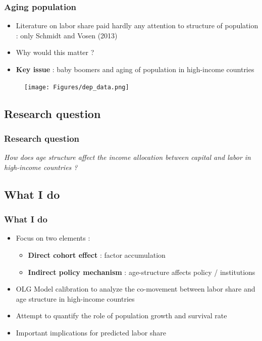\documentclass{beamer}
\begin{document}
			\begin{frame}\frametitle{Aging population}
				\begin{minipage}[h]{.49\textwidth}
					\begin{adjustwidth}{-2em}{0em}
						\begin{itemize}
							\item Literature on labor share paid hardly any attention to structure of population : only Schmidt and Vosen (2013)
							\vspace{1em}
							\item Why would this matter ?
							\vspace{1em}
							\item \textbf{Key issue} : baby boomers and aging of population in high-income countries
						\end{itemize}
					\end{adjustwidth}
				\end{minipage}
				\begin{minipage}[h]{.49\textwidth}
					\begin{figure}[h]
						\texttt{[image: Figures/dep\_data.png]}
					\end{figure}
				\end{minipage}
			\end{frame}
		
		\subsection{Research question}
		\begin{frame}\frametitle{Research question}
			\Large\textit{How does age structure affect the income allocation between capital and labor in high-income countries ?}
		\end{frame}
		
		\subsection{What I do}
		\begin{frame}\frametitle{What I do}
				\begin{itemize}
					\item Focus on two elements :
					\begin{itemize}
						\item \textbf{Direct cohort effect} : factor accumulation
						\item \textbf{Indirect policy mechanism} : age-structure affects policy / institutions
					\end{itemize}
					\vspace{1em}
					\item OLG Model calibration to analyze the co-movement between labor share and age structure in high-income countries
					\vspace{1em}
					\item Attempt to quantify the role of population growth and survival rate
					\item Important implications for predicted labor share
				\end{itemize}
			\end{frame}
\end{document}

